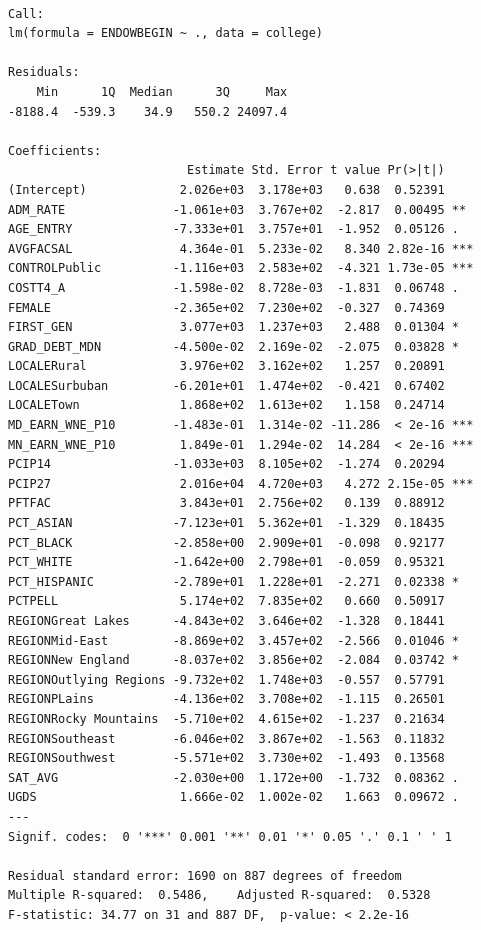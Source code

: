 \documentclass[
  letterpaper,
  DIV=11,
  numbers=noendperiod]{scrartcl}
\begin{document}
\begin{verbatim}

Call:
lm(formula = ENDOWBEGIN ~ ., data = college)

Residuals:
    Min      1Q  Median      3Q     Max 
-8188.4  -539.3    34.9   550.2 24097.4 

Coefficients:
                         Estimate Std. Error t value Pr(>|t|)    
(Intercept)             2.026e+03  3.178e+03   0.638  0.52391    
ADM_RATE               -1.061e+03  3.767e+02  -2.817  0.00495 ** 
AGE_ENTRY              -7.333e+01  3.757e+01  -1.952  0.05126 .  
AVGFACSAL               4.364e-01  5.233e-02   8.340 2.82e-16 ***
CONTROLPublic          -1.116e+03  2.583e+02  -4.321 1.73e-05 ***
COSTT4_A               -1.598e-02  8.728e-03  -1.831  0.06748 .  
FEMALE                 -2.365e+02  7.230e+02  -0.327  0.74369    
FIRST_GEN               3.077e+03  1.237e+03   2.488  0.01304 *  
GRAD_DEBT_MDN          -4.500e-02  2.169e-02  -2.075  0.03828 *  
LOCALERural             3.976e+02  3.162e+02   1.257  0.20891    
LOCALESurbuban         -6.201e+01  1.474e+02  -0.421  0.67402    
LOCALETown              1.868e+02  1.613e+02   1.158  0.24714    
MD_EARN_WNE_P10        -1.483e-01  1.314e-02 -11.286  < 2e-16 ***
MN_EARN_WNE_P10         1.849e-01  1.294e-02  14.284  < 2e-16 ***
PCIP14                 -1.033e+03  8.105e+02  -1.274  0.20294    
PCIP27                  2.016e+04  4.720e+03   4.272 2.15e-05 ***
PFTFAC                  3.843e+01  2.756e+02   0.139  0.88912    
PCT_ASIAN              -7.123e+01  5.362e+01  -1.329  0.18435    
PCT_BLACK              -2.858e+00  2.909e+01  -0.098  0.92177    
PCT_WHITE              -1.642e+00  2.798e+01  -0.059  0.95321    
PCT_HISPANIC           -2.789e+01  1.228e+01  -2.271  0.02338 *  
PCTPELL                 5.174e+02  7.835e+02   0.660  0.50917    
REGIONGreat Lakes      -4.843e+02  3.646e+02  -1.328  0.18441    
REGIONMid-East         -8.869e+02  3.457e+02  -2.566  0.01046 *  
REGIONNew England      -8.037e+02  3.856e+02  -2.084  0.03742 *  
REGIONOutlying Regions -9.732e+02  1.748e+03  -0.557  0.57791    
REGIONPLains           -4.136e+02  3.708e+02  -1.115  0.26501    
REGIONRocky Mountains  -5.710e+02  4.615e+02  -1.237  0.21634    
REGIONSoutheast        -6.046e+02  3.867e+02  -1.563  0.11832    
REGIONSouthwest        -5.571e+02  3.730e+02  -1.493  0.13568    
SAT_AVG                -2.030e+00  1.172e+00  -1.732  0.08362 .  
UGDS                    1.666e-02  1.002e-02   1.663  0.09672 .  
---
Signif. codes:  0 '***' 0.001 '**' 0.01 '*' 0.05 '.' 0.1 ' ' 1

Residual standard error: 1690 on 887 degrees of freedom
Multiple R-squared:  0.5486,    Adjusted R-squared:  0.5328 
F-statistic: 34.77 on 31 and 887 DF,  p-value: < 2.2e-16
\end{verbatim}
\end{document}
